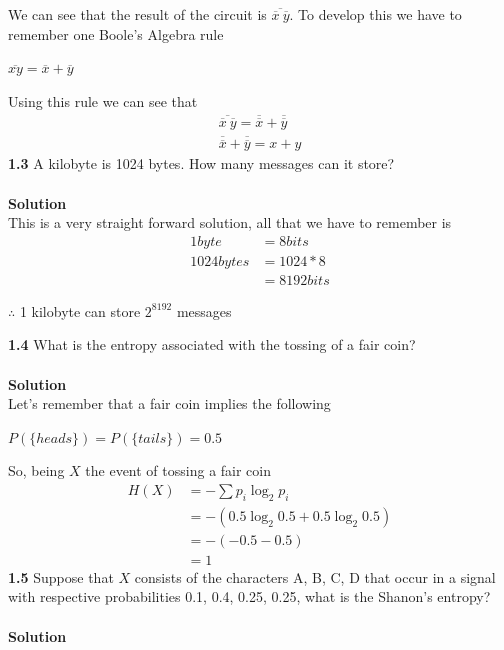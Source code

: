 \documentclass{article}
\begin{document}
We can see that the result of the circuit is $\overline{\overline{x} \ \overline{y}}$. To develop this we have to remember one Boole's Algebra rule
\begin{center}
$\overline{xy} = \overline{x} + \overline{y}$
\end{center}
Using this rule we can see that \\
\begin{align*}
\overline{\overline{x} \ \overline{y}} = \overline{\overline{x}} + \overline{\overline{y}}\\
\overline{\overline{x}} + \overline{\overline{y}} = x + y
\end{align*}
\textbf{1.3} A kilobyte is 1024 bytes. How many messages can it store?\\ \\
\textbf{Solution}\\
This is a very straight forward solution, all that we have to remember is\\
\begin{align*}
1 byte &= 8 bits\\
1024 bytes &= 1024 * 8\\
&= 8192 bits
\end{align*}
\begin{center}
$\therefore{}$ 1 kilobyte can store $2^{8192}$ messages\\
\end{center}
\textbf{1.4} What is the entropy associated with the tossing of a fair coin?\\ \\
\textbf{Solution}\\
Let's remember that a fair coin implies the following\\
\begin{center}
$P(\{heads\}) = P(\{tails\}) = 0.5$
\end{center}
So, being $X$ the event of tossing a fair coin\\
\begin{align*}
H(X) &= -\sum p_i \log_2 p_i\\
&= -(0.5 \log_2 0.5 + 0.5 \log_2 0.5)\\
&= -(-0.5 - 0.5)\\
&= 1
\end{align*}
\textbf{1.5} Suppose that $X$ consists of the characters A, B, C, D that occur in a signal with respective probabilities 0.1, 0.4, 0.25, 0.25, what is  the Shanon's entropy?\\ \\
\textbf{Solution}\\
\end{document}

